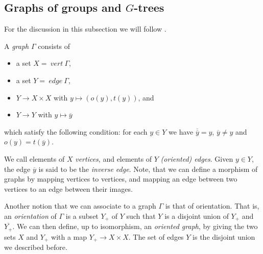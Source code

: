 
\subsection{Graphs of groups and $G$-trees}

For the discussion in this subsection we will follow \cite[chapter I]{Ser80}.

\begin{definition}
    A \emph{graph} $\Gamma$ consists of 
    \begin{itemize}
        \item a set $X = \:vert\:\Gamma$,
        \item a set $Y = \:edge\:\Gamma$,
        \item $Y \to  X \times X$ with $ y \mapsto (o(y), t(y))$, and 
        \item $Y \to Y$ with $y \mapsto \overline{y}$
    \end{itemize}
     which satisfy the following condition: for each $y \in Y$ we have $\overline{\overline{y}} = y$, $\overline{y} \neq y$ and $o(y) = t(\overline{y})$.
\end{definition}

We call elements of $X$ \emph{vertices}, and elements of $Y$ \emph{(oriented) edges}. Given $y \in Y$, the edge $\overline{y}$ is said to be the \emph{inverse edge}. Note, that we can define a morphism of graphs by mapping vertices to vertices, and mapping an edge between two vertices to an edge between their images.

Another notion that we can associate to a graph $\Gamma$ is that of orientation. That is, an \emph{orientation} of $\Gamma$ is a subset $Y_+$ of $Y$ such that $Y$ is a disjoint union of $Y_+$ and $\overline{Y_+}$. We can then define, up to isomorphism, an \emph{oriented graph}, by giving the two sets $X$ and $Y_+$ with a map $Y_+ \to X \times X$. The set of edges $Y$ is the disjoint union we described before.



